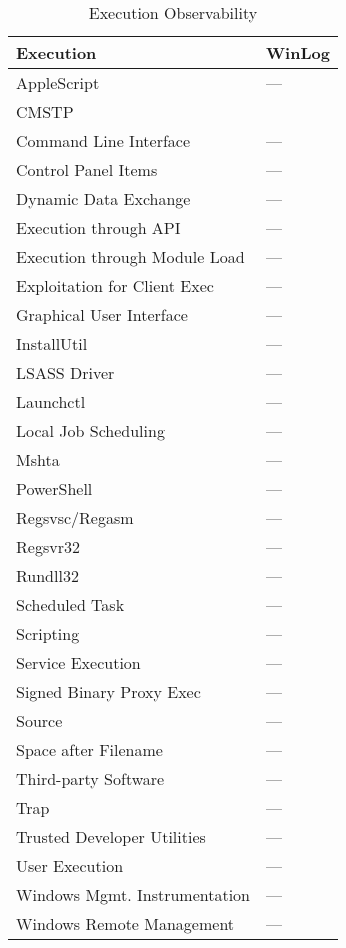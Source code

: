 \documentclass[journal]{IEEEtran}
\begin{document}
\begin{table}
\centering
\caption{Execution Observability}
\label{tab:exec-mech}
\begin{tabular}{|l|l|}
\hline
\rowcolor[HTML]{EFEFEF} 
\textbf{Execution}		          & \textbf{WinLog} 	\\\hline
AppleScript						  & ---    				\\\hline
CMSTP						      &       			\\\hline
Command Line Interface			  & ---       			\\\hline
Control Panel Items				  & ---     			\\\hline
Dynamic Data Exchange			  & ---       			\\\hline
Execution through API			  & ---      			\\\hline
Execution through Module Load	  & ---    				\\\hline
Exploitation for Client Exec	  & ---      			\\\hline
Graphical User Interface		  & ---       			\\\hline
InstallUtil						  & ---     			\\\hline
LSASS Driver					  & ---       			\\\hline
Launchctl						  & ---      			\\\hline
Local Job Scheduling	          & ---    				\\\hline
Mshta					          & ---      			\\\hline
PowerShell				          & ---       			\\\hline
Regsvsc/Regasm			          & ---     			\\\hline
Regsvr32				          & ---       			\\\hline
Rundll32				          & ---      			\\\hline	
Scheduled Task                    & ---    				\\\hline
Scripting       				  & ---      			\\\hline
Service Execution       		  & ---       			\\\hline
Signed Binary Proxy Exec   	      & ---     			\\\hline
Source						      & ---       			\\\hline
Space after Filename			  & ---      			\\\hline
Third-party Software			  & ---      			\\\hline	
Trap                              & ---    				\\\hline
Trusted Developer Utilities		  & ---      			\\\hline
User Execution					  & ---       			\\\hline
Windows Mgmt. Instrumentation	  & ---     			\\\hline
Windows Remote Management		  & ---       			\\\hline
\end{tabular}
\end{table}
\end{document}
